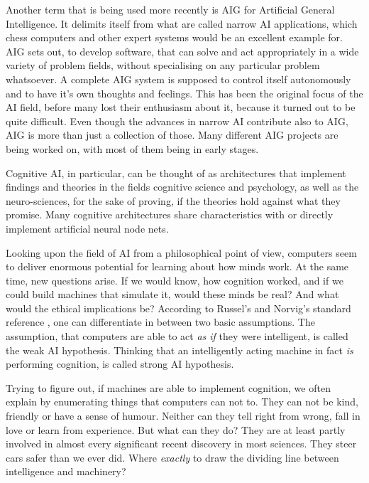 Another term that is being used more recently is AIG for Artificial General Intelligence. It delimits itself from what are called narrow AI applications, which chess computers and other expert systems would be an excellent example for. AIG sets out, to develop software, that can solve and act appropriately in a wide variety of problem fields, without specialising on any particular problem whatsoever. A complete AIG system is supposed to control itself autonomously and to have it's own thoughts and feelings. This has been the original focus of the AI field, before many lost their enthusiasm about it, because it turned out to be quite difficult. Even though the advances in narrow AI contribute also to AIG, AIG is more than just a collection of those. Many different AIG projects are being worked on, with most of them being in early stages.\cite{goertzel2007artificial}

Cognitive AI, in particular, can be thought of as architectures that implement findings and theories in the fields cognitive science and psychology, as well as the neuro-sciences, for the sake of proving, if the theories hold against what they promise. Many cognitive architectures share characteristics with or directly implement artificial neural node nets.

Looking upon the field of AI from a philosophical point of view, computers seem to deliver enormous potential for learning about how minds work. At the same time, new questions arise. If we would know, how cognition worked, and if we could build machines that simulate it, would these minds be real? And what would the ethical implications be? According to Russel's and Norvig's standard reference \cite{russell2009artificial}, one can differentiate in between two basic assumptions. The assumption, that computers are able to act \emph{as if} they were intelligent, is called the weak AI hypothesis. Thinking that an intelligently acting machine in fact \emph{is} performing cognition, is called strong AI hypothesis.

Trying to figure out, if machines are able to implement cognition, we often explain by enumerating things that computers can not to. They can not be kind, friendly or have a sense of humour. Neither can they tell right from wrong, fall in love or learn from experience. But what can they do? They are at least partly involved in almost every significant recent discovery in most sciences. They steer cars safer than we ever did. Where \emph{exactly} to draw the dividing line between intelligence and machinery?~\cite{russell2009artificial}


